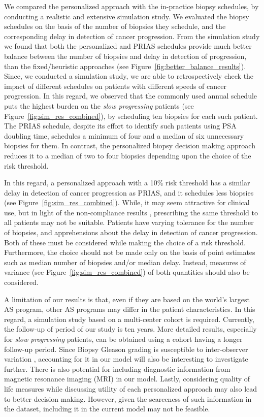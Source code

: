 We compared the personalized approach with the in-practice biopsy schedules, by conducting a realistic and extensive simulation study. We evaluated the biopsy schedules on the basis of the number of biopsies they schedule, and the corresponding delay in detection of cancer progression. From the simulation study we found that both the personalized and PRIAS schedules provide much better balance between the number of biopsies and delay in detection of progression, than the fixed/heuristic approaches (see Figure~\ref{fig:better_balance_results}). Since, we conducted a simulation study, we are able to retrospectively check the impact of different schedules on patients with different speeds of cancer progression. In this regard, we observed that the commonly used annual schedule puts the highest burden on the \textit{slow progressing} patients (see Figure~\ref{fig:sim_res_combined}), by scheduling ten biopsies for each such patient. The PRIAS schedule, despite its effort to identify such patients using PSA doubling time, schedules a minimum of four and a median of six unnecessary biopsies for them. In contrast, the personalized biopsy decision making approach reduces it to a median of two to four biopsies depending upon the choice of the risk threshold. 

In this regard, a personalized approach with a 10\% risk threshold has a similar delay in detection of cancer progression as PRIAS, and it schedules less biopsies (see Figure~\ref{fig:sim_res_combined}). While, it may seem attractive for clinical use, but in light of the non-compliance results \citep{bokhorst2015compliance}, prescribing the same threshold to all patients may not be suitable. Patients have varying tolerance for the number of biopsies, and apprehensions about the delay in detection of cancer progression. Both of these must be considered while making the choice of a risk threshold. Furthermore, the choice should not be made only on the basis of point estimates such as median number of biopsies and/or median delay. Instead, measures of variance (see Figure~\ref{fig:sim_res_combined}) of both quantities should also be considered.

A limitation of our results is that, even if they are based on the world's largest AS program, other AS programs may differ in the patient characteristics\cite{inoue2018comparative}. In this regard, a simulation study based on a multi-center cohort is required. Currently, the follow-up of period of our study is ten years. More detailed results, especially for \textit{slow progressing} patients, can be obtained using a cohort having a longer follow-up period. Since Biopsy Gleason grading is susceptible to inter-observer variation \cite{Gleason_interobs_var}, accounting for it in our model will also be interesting to investigate further. There is also potential for including diagnostic information from magnetic resonance imaging (MRI) in our model. Lastly, considering quality of life measures while discussing utility of each personalized approach may also lead to better decision making. However, given the scarceness of such information in the dataset, including it in the current model may not be feasible.
